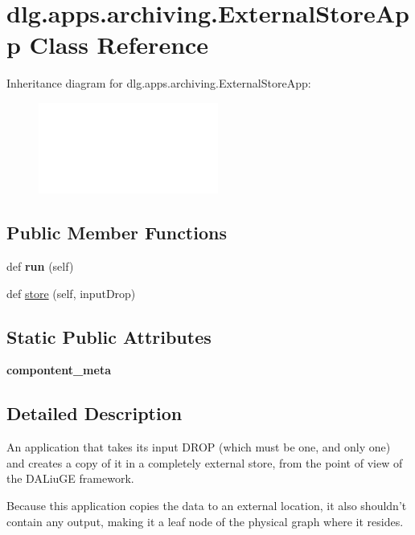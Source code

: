 \hypertarget{classdlg_1_1apps_1_1archiving_1_1_external_store_app}{}\section{dlg.\+apps.\+archiving.\+External\+Store\+App Class Reference}
\label{classdlg_1_1apps_1_1archiving_1_1_external_store_app}
Inheritance diagram for dlg.\+apps.\+archiving.\+External\+Store\+App\+:\begin{figure}[H]
\begin{center}
\leavevmode
\includegraphics[height=3.000000cm]{classdlg_1_1apps_1_1archiving_1_1_external_store_app}
\end{center}
\end{figure}
\subsection*{Public Member Functions}
\begin{DoxyCompactItemize}
\item 
\mbox{\label{classdlg_1_1apps_1_1archiving_1_1_external_store_app_afdbd2bcc0d65f5605d88db611cae2c7b}} 
def {\bfseries run} (self)
\item 
def \mbox{\hyperlink{classdlg_1_1apps_1_1archiving_1_1_external_store_app_a6a41c4de0c0a291d8d7924563a592a64}{store}} (self, input\+Drop)
\end{DoxyCompactItemize}
\subsection*{Static Public Attributes}
\begin{DoxyCompactItemize}
\item 
{\bfseries compontent\+\_\+meta}
\end{DoxyCompactItemize}


\subsection{Detailed Description}
\begin{DoxyVerb}An application that takes its input DROP (which must be one, and only
one) and creates a copy of it in a completely external store, from the point
of view of the DALiuGE framework.

Because this application copies the data to an external location, it also
shouldn't contain any output, making it a leaf node of the physical graph
where it resides.
\end{DoxyVerb}
 

